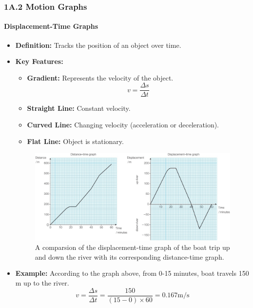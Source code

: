 
\subsubsection{1A.2 Motion Graphs}
\paragraph{Displacement-Time Graphs}
\begin{itemize}
    \item \textbf{Definition:} Tracks the position of an object over time.
    \item \textbf{Key Features:}
    \begin{itemize}
        \item \textbf{Gradient:} Represents the velocity of the object.
        \begin{equation}
            v = \frac{\Delta s}{\Delta t}
        \end{equation}
        \item \textbf{Straight Line:} Constant velocity.
        \item \textbf{Curved Line:} Changing velocity (acceleration or deceleration).
        \item \textbf{Flat Line:} Object is stationary.
    \end{itemize}
    \begin{figure}[H]
        \centering
        \includegraphics[scale=0.2]{Physics/1A/Images/1A-2-1.png}
        \caption{A comparsion of the displacement-time graph of the boat trip up and down the river with its corresponding
        distance-time graph.}
    \end{figure}
    \item \textbf{Example:} According to the graph above, from 0-15 minutes, boat travels 150 m up to the river.
    \begin{equation}
        v = \frac{\Delta s}{\Delta t} = \frac{150}{\left(15 - 0\right) \times 60} = 0.167 \text{m/s}
    \end{equation}
\end{itemize}

